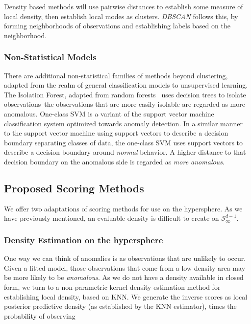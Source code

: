 Density based methods will use pairwise distances to establish some measure of local density, then
  establish local modes as clusters.  \emph{DBSCAN} \citep{ester1996} follows this, by forming
  neighborhoods of observations and establishing labels based on the neighborhood.

\subsubsection{Non-Statistical Models}
There are additional non-statistical families of methods beyond clustering, adapted from the realm
  of general classification models to unsupervised learning.  The Isolation Forest,\citep{liu2000}
  adapted from random forests~\citep{breiman2001} uses decision trees to isolate observations--the
  observations that are more easily isolable are regarded as more anomalous.  One-class SVM
  \citep{chang2011} is a variant of the support vector machine classification system optimized towards
  anomaly detection. In a similar manner to the support vector machine using support vectors to
  describe a decision boundary separating classes of data, the one-class SVM uses support vectors to
  describe a decision boundary around \emph{normal} behavior.  A higher distance to that decision
  boundary on the anomalous side is regarded as \emph{more anomalous}.

\subsection{Proposed Scoring Methods}
We offer two adaptations of scoring methods for use on the hypersphere.  As we have previously
  mentioned, an evaluable density is difficult to create on $\mathcal{S}_{\infty}^{d-1}$.

\subsubsection{Density Estimation on the hypersphere}
One way we can think of anomalies is as observations that are unlikely to occur.  Given a fitted model,
  those observations that come from a low density area may be more likely to be \emph{anomalous}.
  As we do not have a density available in closed form, we turn to a non-parametric kernel density
  estimation method for establishing local density, based on KNN.  We generate the inverse scores as
  local posterior predictive density (as established by the KNN estimator), times the probability of
  observing 

